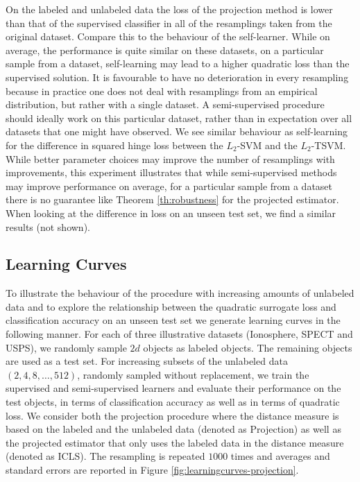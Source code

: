 \documentclass[smallcondensed]{svjour3}\usepackage[]{graphicx}\usepackage[]{color}
\begin{document}
On the labeled and unlabeled data the loss of the projection method is lower than that of the supervised classifier in all of the resamplings taken from the original dataset. Compare this to the behaviour of the self-learner. While on average, the performance is quite similar on these datasets, on a particular sample from a dataset, self-learning may lead to a higher quadratic loss than the supervised solution. It is favourable to have no deterioration in every resampling because in practice one does not deal with resamplings from an empirical distribution, but rather with a single dataset. A semi-supervised procedure should ideally work on this particular dataset, rather than in expectation over all datasets that one might have observed. We see similar behaviour as self-learning for the difference in squared hinge loss between the $L_2$-SVM and the $L_2$-TSVM. While better parameter choices may improve the number of resamplings with improvements, this experiment illustrates that while semi-supervised methods may improve performance on average, for a particular sample from a dataset there is no guarantee like Theorem \ref{th:robustness} for the projected estimator. When looking at the difference in loss on an unseen test set, we find a similar results (not shown).

\subsection{Learning Curves}
To illustrate the behaviour of the procedure with increasing amounts of unlabeled data and to explore the relationship between the quadratic surrogate loss and classification accuracy on an unseen test set we generate learning curves in the following manner. For each of three illustrative datasets (Ionosphere, SPECT and USPS), we randomly sample $2 d$ objects as labeled objects. The remaining objects are used as a test set. For increasing subsets of the unlabeled data $(2,4,8,\dots,512)$, randomly sampled without replacement, we train the supervised and semi-supervised learners and evaluate their performance on the test objects, in terms of classification accuracy as well as in terms of quadratic loss. We consider both the projection procedure where the distance measure is based on the labeled and the unlabeled data (denoted as Projection) as well as the projected estimator that only uses the labeled data in the distance measure (denoted as ICLS). The resampling is repeated $1000$ times and averages and standard errors are reported in Figure \ref{fig:learningcurves-projection}.
\end{document}
